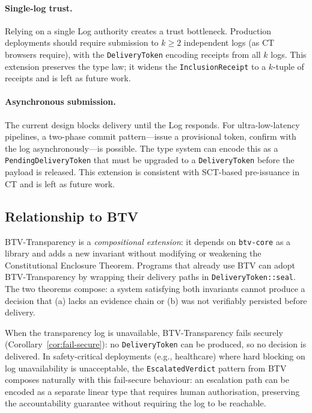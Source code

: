\paragraph{Single-log trust.}
Relying on a single Log authority creates a trust bottleneck. Production
deployments should require submission to $k \geq 2$ independent logs (as CT
browsers require), with the \texttt{DeliveryToken} encoding receipts from all
$k$ logs. This extension preserves the type law; it widens the
\texttt{InclusionReceipt} to a $k$-tuple of receipts and is left as future
work.

\paragraph{Asynchronous submission.}
The current design blocks delivery until the Log responds. For
ultra-low-latency pipelines, a two-phase commit pattern---issue a provisional
token, confirm with the log asynchronously---is possible. The type system can
encode this as a \texttt{PendingDeliveryToken} that must be upgraded to a
\texttt{DeliveryToken} before the payload is released. This extension is
consistent with SCT-based pre-issuance in CT and is left as future work.

\subsection{Relationship to BTV}

BTV-Transparency is a \emph{compositional extension}: it depends on
\texttt{btv-core} as a library and adds a new invariant without modifying or
weakening the Constitutional Enclosure Theorem. Programs that already use BTV
can adopt BTV-Transparency by wrapping their delivery paths in
\texttt{DeliveryToken::seal}. The two theorems compose: a system satisfying
both invariants cannot produce a decision that (a) lacks an evidence chain or
(b) was not verifiably persisted before delivery.

When the transparency log is unavailable, BTV-Transparency fails securely
(Corollary~\ref{cor:fail-secure}): no \texttt{DeliveryToken} can be produced,
so no decision is delivered. In safety-critical deployments (e.g., healthcare)
where hard blocking on log unavailability is unacceptable, the
\texttt{EscalatedVerdict} pattern from BTV~\cite{btv2026} composes naturally
with this fail-secure behaviour: an escalation path can be encoded as a
separate linear type that requires human authorisation, preserving the
accountability guarantee without requiring the log to be reachable.

